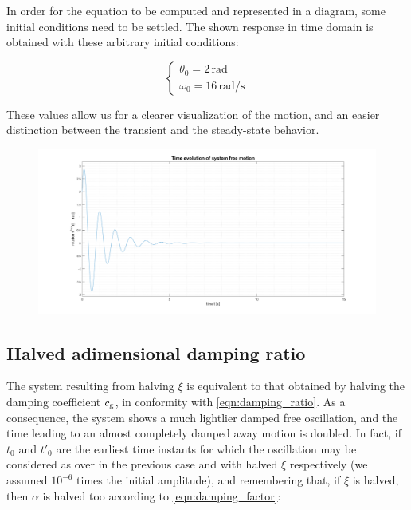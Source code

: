\documentclass[a4paper,12pt,oneside]{article}
\begin{document}
In order for the equation to be computed and represented in a diagram, some initial conditions need to be settled. The shown response in time domain is obtained with these arbitrary initial conditions:

\[ \begin{cases}
	\theta_0 = 2 \, \text{rad} \\
	\omega_0 = 16 \, \text{rad/s}
\end{cases} \]

These values allow us for a clearer visualization of the motion, and an easier distinction between the transient and the steady-state behavior.

\begin{figure}[H]
	\hspace{-30pt}
	\includegraphics[scale=0.35]{free_time_response}
\end{figure}

\vspace{50pt}

\subsection{Halved adimensional damping ratio}

The system resulting from halving $ \xi $ is equivalent to that obtained by halving the damping coefficient $ c_\textup{g} $, in conformity with \eqref{eqn:damping_ratio}. As a consequence, the system shows a much lightlier damped free oscillation, and the time leading to an almost completely damped away motion is doubled. In fact, if $ t_0 $ and $ t'_0 $ are the earliest time instants for which the oscillation may be considered as over in the previous case and with halved $ \xi $ respectively (we assumed $ 10^{-6} $ times the initial amplitude), and remembering that, if $ \xi $ is halved, then $ \alpha $ is halved too according to \eqref{eqn:damping_factor}:
\end{document}
